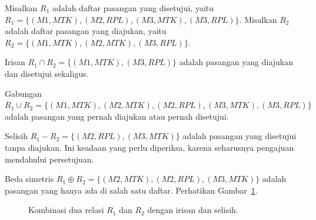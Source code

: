 \documentclass[11pt,a4paper]{article}
\begin{document}
Misalkan $R_1$ adalah daftar pasangan yang disetujui, yaitu $R_1=\{(M1,MTK),(M2,RPL),(M3,MTK),(M3,RPL)\}$. Misalkan $R_2$ adalah daftar pasangan yang diajukan, yaitu $R_2=\{(M1,MTK),(M2,MTK),(M3,RPL)\}$.

Irisan $R_1 \cap R_2=\{(M1,MTK),(M3,RPL)\}$ adalah pasangan yang diajukan dan disetujui sekaligus.

Gabungan $R_1 \cup R_2=\{(M1,MTK),(M2,MTK),(M2,RPL),(M3,MTK),(M3,RPL)\}$ adalah pasangan yang pernah diajukan atau pernah disetujui.

Selisih $R_1-R_2=\{(M2,RPL),(M3,MTK)\}$ adalah pasangan yang disetujui tanpa diajukan. Ini keadaan yang perlu diperiksa, karena seharusnya pengajuan mendahului persetujuan.

Beda simetris $R_1 \oplus R_2=\{(M2,MTK),(M2,RPL),(M3,MTK)\}$ adalah pasangan yang hanya ada di salah satu daftar. Perhatikan Gambar~\ref{fig:kombinasi}.

\begin{figure}[H]
	\centering
	\caption{Kombinasi dua relasi $R_1$ dan $R_2$ dengan irisan dan selisih.}
	\label{fig:kombinasi}
\end{figure}
\end{document}
